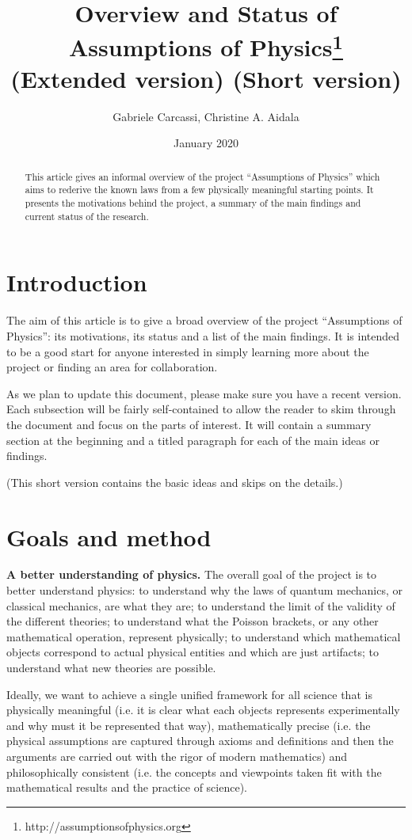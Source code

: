 \documentclass[twocolumn]{article}
\title{Overview and Status of Assumptions of Physics\footnote{http://assumptionsofphysics.org} \\
\ifextended (Extended version)
\else (Short version)
\fi}
\author{Gabriele Carcassi, Christine A. Aidala}
\date{January 2020}
\newif\ifextended
\begin{document}
\maketitle

\begin{abstract}
	This article gives an informal overview of the project ``Assumptions of Physics'' which aims to rederive the known laws from a few physically meaningful starting points. It presents the motivations behind the project, a summary of the main findings and current status of the research.	
\end{abstract}

\section{Introduction}

The aim of this article is to give a broad overview of the project ``Assumptions of Physics'': its motivations, its status and a list of the main findings. It is intended to be a good start for anyone interested in simply learning more about the project or finding an area for collaboration.

As we plan to update this document, please make sure you have a recent version. Each subsection will be fairly self-contained to allow the reader to skim through the document and focus on the parts of interest. It will contain a summary section at the beginning and a titled paragraph for each of the main ideas or findings.

\ifextended (This extended version contains the same material of the short version, but adds more detail.)
\else (This short version contains the basic ideas and skips on the details.)
\fi

\section{Goals and method}

\textbf{A better understanding of physics.} The overall goal of the project is to better understand physics: to understand why the laws of quantum mechanics, or classical mechanics, are what they are; to understand the limit of the validity of the different theories; to understand what the Poisson brackets, or any other mathematical operation, represent physically; to understand which mathematical objects correspond to actual physical entities and which are just artifacts; to understand what new theories are possible.

Ideally, we want to achieve a single unified framework for all science that is physically meaningful (i.e. it is clear what each objects represents experimentally and why must it be represented that way), mathematically precise (i.e. the physical assumptions are captured through axioms and definitions and then the arguments are carried out with the rigor of modern mathematics) and philosophically consistent (i.e. the concepts and viewpoints taken fit with the mathematical results and the practice of science).
\end{document}
